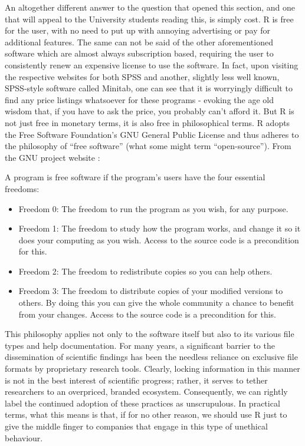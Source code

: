 
An altogether different answer to the question that opened this section, and one that will appeal to the University students reading this, is simply cost. R is free for the user, with no need to put up with annoying advertising or pay for additional features. The same can not be said of the other aforementioned software which are almost always subscription based, requiring the user to consistently renew an expensive license to use the software. In fact, upon visiting the respective websites for both SPSS and another, slightly less well known, SPSS-style software called Minitab, one can see that it is worryingly difficult to find any price listings whatsoever for these programs - evoking the age old wisdom that, if you have to ask the price, you probably can't afford it.  But R is not just free in monetary terms, it is also free in philosophical terms. R adopts the Free Software Foundation’s GNU General Public License and thus adheres to the philosophy of ``free software'' (what some might term ``open-source'').  From the GNU project website \parencite{GNUphil}:

{
\begin{displayquote}
\headingfont
A program is free software if the program's users have the four essential freedoms:

\begin{itemize}
\item Freedom 0: The freedom to run the program as you wish, for any purpose.
\item Freedom 1: The freedom to study how the program works, and change it so it does your computing as you wish. Access to the source code is a precondition for this.
\item Freedom 2: The freedom to redistribute copies so you can help others.
\item Freedom 3: The freedom to distribute copies of your modified versions to others. By doing this you can give the whole community a chance to benefit from your changes. Access to the source code is a precondition for this.
\end{itemize}
\end{displayquote}
}

This philosophy applies not only to the software itself but also to its various file types and help documentation. For many years, a significant barrier to the dissemination of scientific findings has been the needless reliance on exclusive file formats by proprietary research tools. Clearly, locking information in this manner is not in the best interest of scientific progress; rather, it serves to tether researchers to an overpriced, branded ecosystem. Consequently, we can rightly label the continued adoption of these practices as unscrupulous. In practical terms, what this means is that, if for no other reason, we should use R just to give the middle finger to companies that engage in this type of unethical behaviour.


